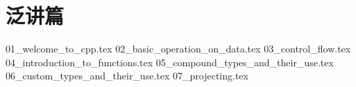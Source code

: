 \part*{泛讲篇}
{01_welcome_to_cpp.tex}
{02_basic_operation_on_data.tex}
{03_control_flow.tex}
{04_introduction_to_functions.tex}
{05_compound_types_and_their_use.tex}
{06_custom_types_and_their_use.tex}
{07_projecting.tex}